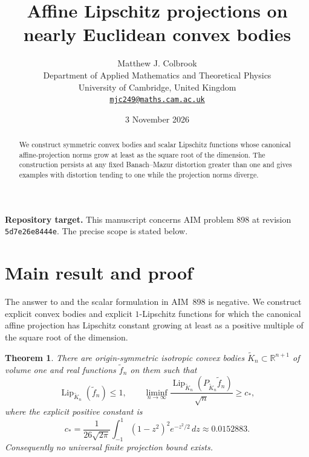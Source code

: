 \documentclass[11pt,a4paper]{article}
\title{\textbf{Affine Lipschitz projections on nearly Euclidean convex bodies}}
\author{Matthew J. Colbrook\\[3pt]
{\small Department of Applied Mathematics and Theoretical Physics}\\
{\small University of Cambridge, United Kingdom}\\
{\small\href{mailto:mjc249@maths.cam.ac.uk}{\texttt{mjc249@maths.cam.ac.uk}}}}
\date{3 November 2026}
\newtheorem{theorem}{Theorem}[section]
\theoremstyle{remark}
\begin{document}
\maketitle
\begin{abstract}
We construct symmetric convex bodies and scalar Lipschitz functions whose canonical affine-projection norms grow at least as the square root of the dimension. The construction persists at any fixed Banach--Mazur distortion greater than one and gives examples with distortion tending to one while the projection norms diverge.
\end{abstract}
\noindent\textbf{Repository target.}
This manuscript concerns AIM problem 898 at revision
\texttt{5d7e26e8444e}. The precise scope is stated below.
\medskip

\section{Main result and proof}
\label{sec:898}

The answer to \cite[Question~19]{HN2019} and the scalar formulation in
AIM~898 is negative.  We construct explicit convex bodies and explicit
$1$-Lipschitz functions for which the canonical affine projection has
Lipschitz constant growing at least as a positive multiple of the square
root of the dimension.

\begin{theorem}\label{thm:898}
There are origin-symmetric isotropic convex bodies
$\widetilde K_n\subset\mathbb R^{n+1}$ of volume one and real functions
$\widetilde f_n$ on them such that
\[
 \operatorname{Lip}_{\widetilde K_n}(\widetilde f_n)\leq1,
 \qquad
 \liminf_{n\to\infty}
 \frac{\operatorname{Lip}_{\widetilde K_n}
       (P_{\widetilde K_n}\widetilde f_n)}{\sqrt n}
 \geq c_*,
\]
where the explicit positive constant is
\[
 c_*=\frac1{26\sqrt{2\pi}}
       \int_{-1}^1(1-z^2)^2e^{-z^2/2}\,dz
       \approx0.0152883.
\]
Consequently no universal finite projection bound exists.
\end{theorem}
\end{document}
